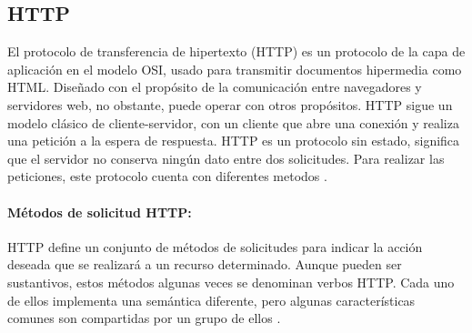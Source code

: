 %
%

\subsection{HTTP}

El protocolo de transferencia de hipertexto (HTTP) es un protocolo de la capa de aplicación en el modelo OSI, usado para transmitir documentos hipermedia como HTML. Diseñado con el propósito de la comunicación entre navegadores y servidores web, no obstante, puede operar con otros propósitos. HTTP sigue un modelo clásico de cliente-servidor, con un cliente que abre una conexión y realiza una petición a la espera de respuesta. HTTP es un protocolo sin estado, significa que el servidor no conserva ningún dato entre dos solicitudes. Para realizar las peticiones, este protocolo cuenta con diferentes metodos \cite{HTTP}.

\paragraph{Métodos de solicitud HTTP:}

HTTP define un conjunto de métodos de solicitudes para indicar la acción deseada que se realizará a un recurso determinado. Aunque pueden ser sustantivos, estos métodos algunas veces se denominan verbos HTTP. Cada uno de ellos implementa una semántica diferente, pero algunas características comunes son compartidas por un grupo de ellos \cite{HTTPM}.\\

